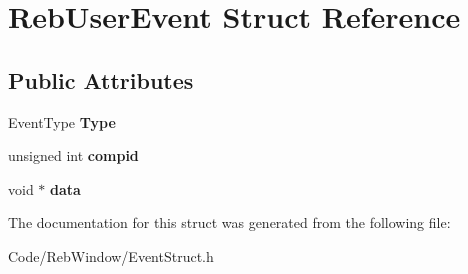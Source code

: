 \hypertarget{struct_reb_user_event}{}\section{Reb\+User\+Event Struct Reference}
\label{struct_reb_user_event}
\subsection*{Public Attributes}
\begin{DoxyCompactItemize}
\item 
Event\+Type {\bfseries Type}\hypertarget{struct_reb_user_event_a03ec571bde956a975c6611716e8b8d73}{}\label{struct_reb_user_event_a03ec571bde956a975c6611716e8b8d73}

\item 
unsigned int {\bfseries compid}\hypertarget{struct_reb_user_event_a861d8a45297706ceca5a9a4767572458}{}\label{struct_reb_user_event_a861d8a45297706ceca5a9a4767572458}

\item 
void $\ast$ {\bfseries data}\hypertarget{struct_reb_user_event_a1b6e37d4e0ac5c82fea5a144258f3f76}{}\label{struct_reb_user_event_a1b6e37d4e0ac5c82fea5a144258f3f76}

\end{DoxyCompactItemize}


The documentation for this struct was generated from the following file\+:\begin{DoxyCompactItemize}
\item 
Code/\+Reb\+Window/Event\+Struct.\+h\end{DoxyCompactItemize}
